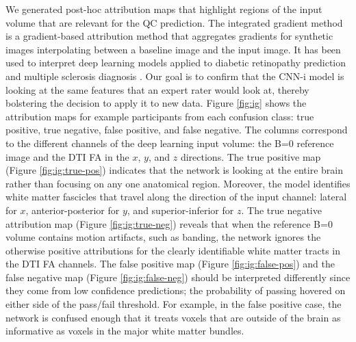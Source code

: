 \documentclass[fleqn,10pt]{wlscirep}
\begin{document}
We generated post-hoc attribution maps that highlight regions of the input
volume that are relevant for the QC prediction. The integrated gradient method
\cite{sundararajan2017axiomatic} is a gradient-based attribution method
\cite{ancona2019gradient} that aggregates gradients for synthetic images
interpolating between a baseline image and the input image. It has been used to
interpret deep learning models applied to diabetic retinopathy prediction
\cite{sayres2019using} and multiple sclerosis diagnosis
\cite{wargnier-dauchelle2021interpretable}. Our goal is to confirm that the
CNN-i model is looking at the same features that an expert rater would look at,
thereby bolstering the decision to apply it to new data. Figure \ref{fig:ig}
shows the attribution maps for example participants from each confusion class:
true positive, true negative, false positive, and false negative. The columns
correspond to the different channels of the deep learning input volume: the B=0
reference image and the DTI FA in the $x$, $y$, and $z$ directions. The true
positive map (Figure \ref{fig:ig:true-pos}) indicates that the network is
looking at the entire brain rather than focusing on any one anatomical region.
Moreover, the model identifies white matter fascicles that travel along the
direction of the input channel: lateral for $x$, anterior-posterior for $y$, and
superior-inferior for $z$.
The true negative attribution map (Figure \ref{fig:ig:true-neg}) reveals that
when the reference B=0 volume contains motion artifacts, such as banding, the
network ignores the otherwise positive attributions for the clearly identifiable
white matter tracts in the DTI FA channels.
The false positive map (Figure \ref{fig:ig:false-pos}) and the false negative
map (Figure \ref{fig:ig:false-neg}) should be interpreted differently since they
come from low confidence predictions; the probability of passing hovered on
either side of the pass/fail threshold. For example, in the false positive case,
the network is confused enough that it treats voxels that are outside of the
brain as informative as voxels in the major white matter bundles.
\end{document}
